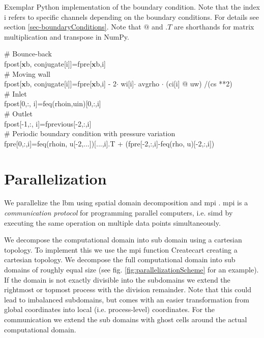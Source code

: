 \documentclass[a4paper,11pt, footsepline]{book}
\begin{document}
\begin{algorithm}
 \caption{\label{algo-boundaryConditions}Exemplar Python implementation of the boundary condition. Note that the index i refers to specific channels depending on the boundary conditions. For details see section \ref{sec-boundaryConditions}. Note that $@$ and $.T$ are shorthands for matrix multiplication and transpose in NumPy.}
     \SetAlgoLined
     \# Bounce-back\\
     f\textunderscore post[$\mathbf{x}$\textunderscore b, conjugate[i]]=f\textunderscore pre[$\mathbf{x}$\textunderscore b,i] \\
     \# Moving wall\\
          f\textunderscore post[$\mathbf{x}$\textunderscore b, conjugate[i]]=f\textunderscore pre[$\mathbf{x}$\textunderscore b,i] - 2$\cdot$ w\textunderscore i[i]$\cdot$ avg\textunderscore rho $\cdot$ (c\textunderscore i[i] @ u\textunderscore w) /(c\textunderscore s **2) \\
          \# Inlet\\
     f\textunderscore post[0,:, i]=f\textunderscore eq(rho\textunderscore in,u\textunderscore in)[0,:,i]\\
     \# Outlet\\
     f\textunderscore post[-1,:, i]=f\textunderscore previous[-2,:,i]\\
     \# Periodic boundary condition with pressure variation\\
  f\textunderscore pre[0,:,i]=f\textunderscore eq(rho\textunderscore in, u[-2,...])[...,i].T + (f\textunderscore pre[-2,:,i]-f\textunderscore eq(rho, u)[-2,:,i])
\end{algorithm}
\section{Parallelization}\label{sec-parallelization}
We parallelize the \ac{lbm} using spatial domain decomposition and \acf{mpi} \cite{Dalcin.2005, Dalcin.2008, Dalcin.2011}. \ac{mpi} is a \textit{communication protocol} for programming parallel computers, i.e. \ac{simd} \cite{Flynn.1972} by executing the same operation on multiple data points simultaneously.

We decompose the computational domain into sub domain using a cartesian topology. To implement this we use the \ac{mpi} function \textsf{Create\textunderscore cart} creating a cartesian topology.
We decompose the full computational domain into sub domains of roughly equal size (see fig. \ref{fig:parallelizationScheme} for an example).
If the domain is not exactly divisible into the subdomains we extend the rightmost or topmost process with the division remainder. Note that this could lead to imbalanced subdomains, but comes with an easier transformation from global coordinates into local (i.e. process-level) coordinates. For the communication we extend the sub domains with ghost cells around the actual computational domain.
\end{document}
